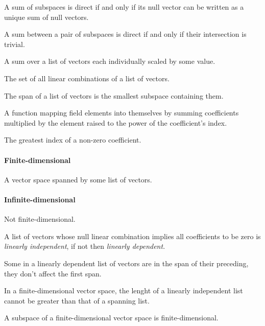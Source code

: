 \begin{multicols}{3}
  A sum of subspaces is direct if and only if its null vector can be written as a unique sum of null vectors.

  A sum between a pair of subspaces is direct if and only if their intersection is trivial.

  A sum over a list of vectors each individually scaled by some value.
  
  The set of all linear combinations of a list of vectors.
  
  The span of a list of vectors is the smallest subspace containing them.

  A function mapping field elements into themselves by summing coefficients multiplied by the element raised to the power of the coefficient's index.
  
  The greatest index of a non-zero coefficient.
  
  \paragraph{\textbf{Finite-dimensional}}
  A vector space spanned by some list of vectors.
  \paragraph{\textbf{Infinite-dimensional}}
  Not finite-dimensional.
  
  A list of vectors whose null linear combination implies all coefficients to be zero is \textit{linearly independent},
  if not then \textit{linearly dependent}.

  Some in a linearly dependent list of vectors are in the span of their preceding, they don't affect the first span.
  
  In a finite-dimensional vector space, the lenght of a linearly independent list cannot be greater than that of a spanning list.
  
  A subspace of a finite-dimensional vector space is finite-dimensional.
  

\end{multicols}
